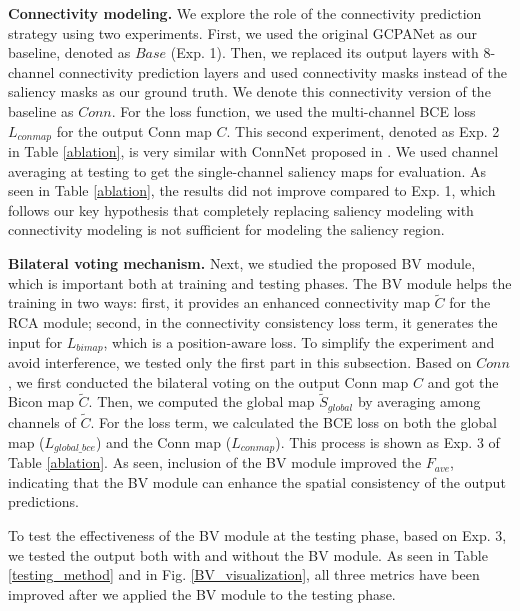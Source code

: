 \documentclass[review]{cvpr}
\begin{document}
\textbf{Connectivity modeling.} We explore the role of the connectivity prediction strategy using two experiments. First, we used the original GCPANet as our baseline, denoted as $Base$ (Exp. 1). Then, we replaced its output layers with 8-channel connectivity prediction layers and used connectivity masks instead of the saliency masks as our ground truth. We denote this connectivity version of the baseline as $Conn$. For the loss function, we used the multi-channel BCE loss $L_{conmap}$ for the output Conn map $C$. This second experiment, denoted as Exp. 2 in Table \ref{ablation}, is very similar with ConnNet proposed in \cite{ConnNet}. We used channel averaging at testing to get the single-channel saliency maps for evaluation. As seen in Table \ref{ablation}, the results did not improve compared to Exp. 1, which follows our key hypothesis that completely replacing saliency modeling with connectivity modeling is not sufficient for modeling the saliency region.


\textbf{Bilateral voting mechanism.} Next, we studied the proposed BV module, which is important both at training and testing phases. The BV module helps the training in two ways: first, it provides an enhanced connectivity map $\widetilde{C}$ for the RCA module; second, in the connectivity consistency loss term, it generates the input for $L_{bimap}$, which is a position-aware loss. To simplify the experiment and avoid interference, we tested only the first part in this subsection. Based on $Conn$, we first conducted the bilateral voting on the output Conn map $C$ and got the Bicon map $\widetilde{C}$. Then, we computed the global map $\widetilde{S}_{global}$ by averaging among channels of $\widetilde{C}$. For the loss term, we calculated the BCE loss on both the global map ($L_{global\_bce}$) and the Conn map ($L_{conmap}$). This process is shown as Exp. 3 of Table \ref{ablation}. As seen, inclusion of the BV module improved the  $F_{ave}$, indicating that the BV module can enhance the spatial consistency of the output predictions.

To test the effectiveness of the BV module at the testing phase, based on Exp. 3, we tested the output both with and without the BV module. As seen in Table \ref{testing_method} and in Fig. \ref{BV_visualization}, all three metrics have been improved after we applied the BV module to the testing phase.
\end{document}
